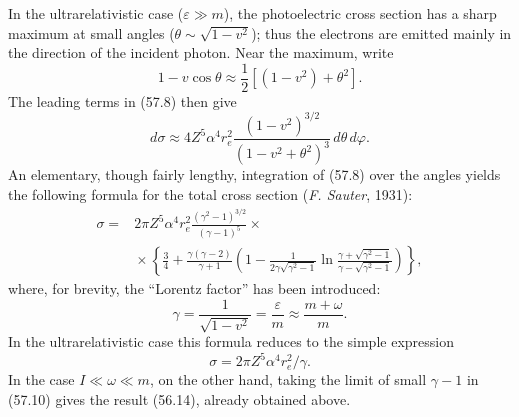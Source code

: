 In the ultrarelativistic case ($\varepsilon\gg m$), the photoelectric cross section has a sharp maximum at small angles ($\theta\sim\sqrt{1-v^2}$); thus the electrons are emitted mainly in the direction of the incident photon. Near the maximum, write
\[
1-v\cos\theta\approx\frac12[(1-v^2)+\theta^2].
\]
The leading terms in (57.8) then give
\begin{equation}
d\sigma\approx4Z^5\alpha^4r_e^2
\frac{(1-v^2)^{3/2}}{(1-v^2+\theta^2)^3}
\,d\theta\,d\varphi.
\tag{57.9}
\end{equation}
An elementary, though fairly lengthy, integration of (57.8) over the angles yields the following formula for the
total cross section (\emph{F. Sauter}, 1931):
\begin{equation}
\begin{aligned}
\sigma={}&2\pi Z^5\alpha^4r_e^2
\frac{(\gamma^2-1)^{3/2}}{(\gamma-1)^5}\mathbin{\times}\\
&{}\mathbin{\times}\left\{
\frac34+\frac{\gamma(\gamma-2)}{\gamma+1}
\left(1-\frac1{2\gamma\sqrt{\gamma^2-1}}
\ln\frac{\gamma+\sqrt{\gamma^2-1}}
{\gamma-\sqrt{\gamma^2-1}}\right)\right\},
\end{aligned}
\tag{57.10}
\end{equation}
where, for brevity, the ``Lorentz factor'' has been introduced:
\begin{equation}
\gamma=\frac1{\sqrt{1-v^2}}=\frac\varepsilon m
\approx\frac{m+\omega}m.
\tag{57.11}
\end{equation}
In the ultrarelativistic case this formula reduces to the simple expression
\begin{equation}
\sigma=2\pi Z^5\alpha^4r_e^2/\gamma.
\tag{57.12}
\end{equation}
In the case $I\ll\omega\ll m$, on the other hand, taking the limit of small $\gamma-1$ in (57.10) gives the result (56.14), already obtained above.
